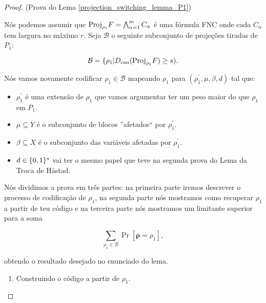 \begin{proof} (Prova do Lema \ref{projection_switching_lemma_P1})

Nós podemos assumir que $\text{Proj}_{\rho_{1}}F = \bigwedge_{\alpha = 1}^{m} C_{\alpha}$ é uma fórmula FNC onde cada $C_{\alpha}$ tem largura no máximo $r$. Seja $\mathcal{B}$ o seguinte subconjunto de projeções tiradas de $P_{1}$:

\begin{equation*}
	\mathcal{B} = \{ \rho_{1} \lvert D_{\text{can}}(\text{Proj}_{\rho_{1}}F) \geq s).
\end{equation*}

Nós vamos novamente codificar $\rho_{1} \in \mathcal{B}$ mapeando $\rho_{1}$ para $(\rho_{1}^{\prime}, \mu, \beta, d)$ tal que:

\begin{itemize}

	\item $\rho_{1}^{\prime}$ é uma extensão de $\rho_{1}$ que vamos argumentar ter um peso maior do que $\rho_{1}$ em $P_{1}$.
	
	\item $\mu \subseteq Y$ é o subconjunto de blocos ''afetados`` por $\rho_{1}^{\prime}$.
	
	\item $\beta \subseteq X$ é o subconjunto das variáveis afetadas por $\rho_{1}^{\prime}$.
	
	\item $d \in \{0, 1\}^{s}$ vai ter o mesmo papel que teve na segunda prova do Lema da Troca de Håstad.
	
\end{itemize}

Nós dividimos a prova em três partes: na primeira parte iremos descrever o processo de codificação de $\rho_{1}$, na segunda parte nós mostramos como recuperar $\rho_{1}$ a partir de teu código e na terceira parte nós mostramos um limitante superior para a soma

\begin{equation} \label{projection_switching_lemma_proof_sum}
	\sum_{\rho_{1} \in \mathcal{B}} \Pr[\boldsymbol{\rho} = \rho_{1}],
\end{equation}

obtendo o resultado desejado no enunciado do lema.

\begin{enumerate}

	\item Construindo o código a partir de $\rho_{1}$.
	

\end{enumerate}
\end{proof}

